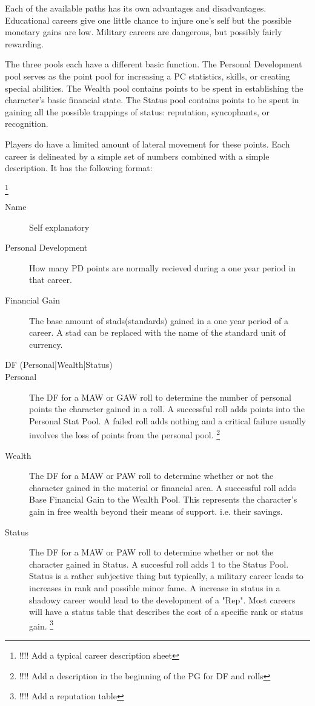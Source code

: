 Each of the available paths has its own advantages and disadvantages.
Educational careers give one little chance to injure one's self but the
possible monetary gains are low.  Military careers are dangerous, but
possibly fairly rewarding.

The three pools each have a different basic function.
The Personal Development pool serves as the point pool for
increasing a PC statistics, skills, or creating special abilities.
The Wealth pool contains points to be spent in establishing the
character's basic financial state.
The Status pool contains points to be spent in gaining all the
possible trappings of status: reputation, syncophants, or recognition.

Players do have a limited amount of lateral movement for these  points.
Each career is delineated by a simple set of numbers combined with a
simple description. It has the following format:

\footnote{!!!! Add a typical career description sheet}
\begin{description}
	\item [Name]
	Self explanatory
    \item[Personal Development]
	How many PD points are normally
	recieved during a one year period in that career.
	\item[Financial Gain]
	The base amount of stads(standards) gained in a one year period of 
	a career. A stad can be replaced with the name of the standard 
	unit of currency.
    \item[DF (Personal|Wealth|Status)]
        \item[Personal]
		The DF for a MAW or GAW roll to determine the number of personal points
		the character gained in a roll. A successful roll adds points into the 
		Personal Stat Pool. A failed roll adds nothing and a critical failure 
        usually involves the loss of points from the personal pool.  
        \footnote{!!!! Add a description in the beginning of the PG for DF and rolls}
        \item[Wealth] The DF for a MAW or PAW
        roll to determine whether or not the character gained in the material 
        or financial area. A successful roll adds Base Financial Gain 
		to the Wealth Pool. This represents the character's gain in free 
		wealth beyond their means of support. i.e. their savings.
        \item[Status] The DF for a MAW or PAW
        roll to determine whether or not the character gained in  
        Status. A succesful roll adds 1 to the Status Pool.
		Status is a rather subjective thing but typically, a 
        military career leads to increases in rank and possible minor fame. A 
        increase in status in a shadowy career would lead to the development 
        of a "Rep".  Most careers will have a status table that describes 
        the cost of a specific rank or status gain. 
		\footnote{!!!! Add a reputation table}
\end{description}

